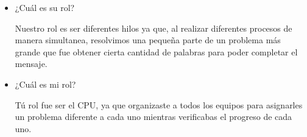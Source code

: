 \documentclass[10pt,letterpaper]{article}
\begin{document}
\begin{itemize}
        


        \item ¿Cuál es su rol?

        Nuestro rol es ser diferentes hilos ya que, al realizar diferentes procesos de manera simultanea, resolvimos una pequeña parte de un problema más grande que fue obtener cierta cantidad de palabras para poder completar el mensaje.

        \item ¿Cuál es mi rol?

        Tú rol fue ser el CPU, ya que organizaste a todos los equipos para asignarles un problema diferente a cada uno mientras verificabas el progreso de cada uno.


    \end{itemize}

\end{document}
